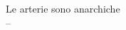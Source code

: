 \thispagestyle{empty}
\vspace*{5em}
\begin{center}
\large
Le arterie sono anarchiche\\ \vspace{0.05em} {\small -- }
\end{center}